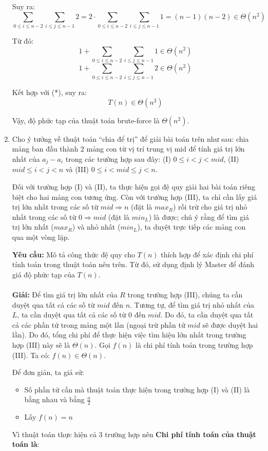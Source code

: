 \documentclass[12pt,a4paper]{article}
\begin{document}
\begin{enumerate}[label=\textbf{Câu 2.\arabic*},leftmargin=*]
          Suy ra: $$\sum_{0 \leq i \leq n-2}\sum_{i \leq j \leq n-1} 2 = 2 \cdot \sum_{0
                  \leq i \leq n-2}\sum_{i \leq j \leq n-1} 1 = (n-1)(n-2) \in \Theta(n^2)$$

          Từ đó: $$ 1 + \sum_{0 \leq i \leq n-2}\sum_{i \leq j \leq n-1} 1 \in
              \Theta(n^2)$$ $$ 1 + \sum_{0 \leq i \leq n-2}\sum_{i \leq j \leq n-1} 2 \in
              \Theta(n^2)$$

          Kết hợp với (*), suy ra: $$T(n) \in \Theta(n^2)$$

          Vậy, độ phức tạp của thuật toán brute-force là $\Theta(n^2)$.
    \item  Cho ý tưởng về thuật toán “chia để trị” để giải bài toán trên như sau: chia mảng ban đầu thành 2 mảng con từ vị trí trung vị mid để tính giá trị lớn nhất của $a_j - a_i$ trong các trường hợp sau đây:
          (I) $0 \le i < j < mid$, (II) $mid \le i < j < n$ và (III) $0 \le i < mid \le j < n$.

          Đối với trường hợp (I) và (II), ta thực hiện gọi đệ quy giải hai bài toán riêng biệt cho hai mảng con tương ứng. Còn với trường hợp (III), ta chỉ cần lấy giá trị lớn nhất trong các số từ $mid \Rightarrow n$ (đặt là $max_R$) rồi trừ cho giá trị nhỏ nhất trong các số từ $0 \Rightarrow mid$ (đặt là $min_L$) là được; chú ý rằng để tìm giá trị lớn nhất ($max_R$) và nhỏ nhất ($min_L$), ta duyệt trực tiếp các
          mảng con qua một vòng lặp.

          \textbf{Yêu cầu:} Mô tả công thức đệ quy cho $T(n)$ thích hợp để xác định chi phí tính toán trong thuật toán nêu trên. Từ đó, sử dụng định lý Master để đánh giá độ phức tạp của $T(n)$.\\ \\
          \textbf{Giải:}
          Để tìm giá trị lớn nhất của $R$ trong trường hợp (III), chúng ta cần duyệt qua tất cả các số từ $mid$ đến $n$. Tương tự, để tìm giá trị nhỏ nhất của $L$, ta cần duyệt qua tất cả các số từ $0$ đến $mid$. Do đó, ta cần duyệt qua tất cả các phần tử trong mảng một lần (ngoại trừ phần tử $mid$ sẽ được duyệt hai lần). Do đó, tổng chi phí để thực hiện việc tìm hiệu lớn nhất trong trường hợp (III) này sẽ là $\Theta(n)$.
          Gọi $f(n)$ là chi phí tính toán trong trường hợp (III). Ta có: $f(n) \in
              \Theta(n)$.

          Để đơn giản, ta giả sử:
          \begin{itemize}
              \item Số phần tử cần mà thuật toán thực hiện trong trường hợp (I) và (II) là bằng
                    nhau và bằng $\frac{n}{2}$
              \item Lấy $f(n) = n$
          \end{itemize}
          Vì thuật toán thực hiện cả 3 trường hợp nên \textbf{Chi phí tính toán của thuật toán là}:


\end{enumerate}
\end{document}

